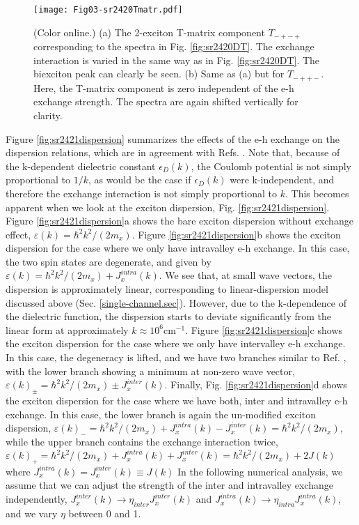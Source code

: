 \documentclass[aps,prb,superscriptaddress,letterpaper,amsmath,amssymb,twocolumn,preprintnumbers]{revtex4}
\begin{document}
\begin{figure}
	\centering
	\texttt{[image: Fig03-sr2420Tmatr.pdf]}
	\caption{
		(Color online.)
		(a) The 2-exciton T-matrix component   $T_{-+-+}$ corresponding to the spectra in Fig. \protect\ref{fig:sr2420DT}. The exchange interaction is varied in the
same way as in  Fig. \protect\ref{fig:sr2420DT}. The biexciton peak can clearly be seen.
(b) Same as (a) but for  $T_{-++-}$. Here, the T-matrix component is zero independent of the e-h exchange strength. The spectra are again shifted vertically for clarity.}	
	\label{fig:sr2420Tmatr}
\end{figure}




Figure \ref{fig:sr2421dispersion} summarizes the effects of the e-h exchange on the dispersion relations, which are in agreement with
Refs. .
%
%
Note that, because of the k-dependent dielectric constant $\epsilon_D(k)$, the Coulomb potential is not simply proportional to $1/k$, as would be the case if $\epsilon_D(k)$ were k-independent,
 and therefore the exchange interaction is not simply proportional to $k$. This becomes apparent when we look at the exciton dispersion, Fig. \ref{fig:sr2421dispersion}. Figure \ref{fig:sr2421dispersion}a shows the bare exciton dispersion without exchange effect,
$\varepsilon(k) = \hbar^2 k^2 / (2 m_x)$.
Figure \ref{fig:sr2421dispersion}b shows the exciton dispersion for the case where we only have intravalley e-h exchange.
In this case, the two spin states are degenerate, and given by
$\varepsilon(k) = \hbar^2 k^2 / (2 m_x) + J^{intra}_{x}(k)$.
We see that, at small wave vectors, the dispersion is approximately linear, corresponding to linear-dispersion model discussed above
(Sec. \ref{single-channel.sec}).
However, due to the k-dependence of the dielectric function, the dispersion starts to deviate significantly from the linear form at approximately
$k \approx 10^6$cm$^{-1}$.
%
Figure \ref{fig:sr2421dispersion}c shows the exciton dispersion for the case where we only have intervalley e-h exchange.
In this case, the degeneracy is lifted, and we have two branches similar to  Ref. , with the lower branch showing a minimum at non-zero wave vector,
$\varepsilon(k)_{\pm} = \hbar^2 k^2 / (2 m_x) \pm J^{inter}_{x}(k)$.
Finally, Fig. \ref{fig:sr2421dispersion}d shows the exciton dispersion for the case where we have both, inter and intravalley e-h exchange. In this case,
the lower branch is again the un-modified exciton dispersion,
$\varepsilon(k)_{-} = \hbar^2 k^2 / (2 m_x) + J^{intra}_{x}(k) - J^{inter}_{x}(k)  =  \hbar^2 k^2 / (2 m_x)   $,
while the upper branch contains the exchange interaction twice,
$\varepsilon(k)_{+} = \hbar^2 k^2 / (2 m_x) + J^{intra}_{x}(k) + J^{inter}_{x}(k)  = \hbar^2 k^2 / (2 m_x) + 2 J(k) $
where $J^{intra}_{x}(k) = J^{inter}_{x}(k) \equiv J(k)$
In the following numerical analysis, we assume that we can adjust the strength of the inter and intravalley exchange independently,
$J^{inter}_{x}(k) \rightarrow  \eta_{inter} J^{inter}_{x}(k)$ and
$J^{intra}_{x}(k) \rightarrow  \eta_{intra}  J^{intra}_{x}(k)$,
and we vary $\eta$ between 0 and 1.
\end{document}
